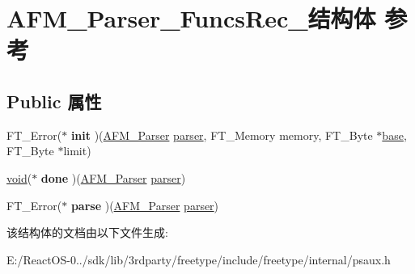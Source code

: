 \hypertarget{struct_a_f_m___parser___funcs_rec__}{}\section{A\+F\+M\+\_\+\+Parser\+\_\+\+Funcs\+Rec\+\_\+结构体 参考}
\label{struct_a_f_m___parser___funcs_rec__}
\subsection*{Public 属性}
\begin{DoxyCompactItemize}
\item 
\mbox{\label{struct_a_f_m___parser___funcs_rec___ab96ca52171618217bc852d01dbdaf4ad}} 
F\+T\+\_\+\+Error($\ast$ {\bfseries init} )(\hyperlink{struct_a_f_m___parser_rec__}{A\+F\+M\+\_\+\+Parser} \hyperlink{structparser}{parser}, F\+T\+\_\+\+Memory memory, F\+T\+\_\+\+Byte $\ast$\hyperlink{structbase}{base}, F\+T\+\_\+\+Byte $\ast$limit)
\item 
\mbox{\label{struct_a_f_m___parser___funcs_rec___ae084d9f1b6768f93629073c9d1c98aee}} 
\hyperlink{interfacevoid}{void}($\ast$ {\bfseries done} )(\hyperlink{struct_a_f_m___parser_rec__}{A\+F\+M\+\_\+\+Parser} \hyperlink{structparser}{parser})
\item 
\mbox{\label{struct_a_f_m___parser___funcs_rec___ad8f41aafada1b5a84f5e1ac46f545669}} 
F\+T\+\_\+\+Error($\ast$ {\bfseries parse} )(\hyperlink{struct_a_f_m___parser_rec__}{A\+F\+M\+\_\+\+Parser} \hyperlink{structparser}{parser})
\end{DoxyCompactItemize}


该结构体的文档由以下文件生成\+:\begin{DoxyCompactItemize}
\item 
E\+:/\+React\+O\+S-\/0../sdk/lib/3rdparty/freetype/include/freetype/internal/psaux.\+h\end{DoxyCompactItemize}
